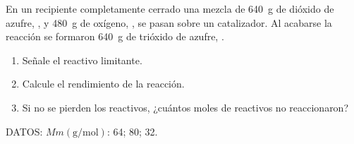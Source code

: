 En un recipiente completamente cerrado una mezcla de \SI{640}{\gram} de dióxido de azufre, , y \SI{480}{\gram} de oxígeno, , se pasan sobre un catalizador. Al acabarse la reacción se formaron \SI{640}{\gram} de trióxido de azufre, .
\begin{enumerate}
	\item Señale el reactivo limitante.
	\item Calcule el rendimiento de la reacción.
	\item Si no se pierden los reactivos, ¿cuántos moles de reactivos no reaccionaron?
\end{enumerate}
DATOS: $Mm(\si{\gram\per\mol})$:   \num{64};   \num{80};   \num{32}.